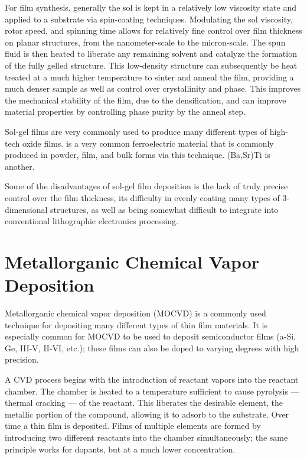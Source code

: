 For film synthesis, generally the sol is kept in a relatively low viscosity state and applied to a substrate via spin-coating techniques. Modulating the sol viscosity, rotor speed, and spinning time allows for relatively fine control over film thickness on planar structures, from the nanometer-scale to the micron-scale. The spun fluid is then heated to liberate any remaining solvent and catalyze the formation of the fully gelled structure. This low-density structure can subsequently be heat treated at a much higher temperature to sinter and anneal the film, providing a much denser sample as well as control over crystallinity and phase. This improves the mechanical stability of the film, due to the densification, and can improve material properties by controlling phase purity by the anneal step. \cite{brinker_sol-gel_1990,Fred_Al2O3_powders_1996,hanaor_solgel_tio2_2011,Yoldas_1979}

Sol-gel films are very commonly used to produce many different types of high-tech oxide films. \cite{Takashi_1994} is a very common ferroelectric material that is commonly produced in powder, film, and bulk forms via this technique. (Ba,Sr)Ti is another.\cite{Tahan_1996}

Some of the disadvantages of sol-gel film deposition is the lack of truly precise control over the film thickness, its difficulty in evenly coating many types of 3-dimensional structures, as well as being somewhat difficult to integrate into conventional lithographic electronics processing.\cite{brinker_sol-gel_1990,Fred_Al2O3_powders_1996,hanaor_solgel_tio2_2011,Yoldas_1979} 


\section{Metallorganic Chemical Vapor Deposition}
\label{sec:Synth-MOCVD}

Metallorganic chemical vapor deposition (MOCVD) is a commonly used technique for depositing many different types of thin film materials. It is especially common for MOCVD to be used to deposit semiconductor films (a-Si, Ge, III-V, II-VI, etc.); these films can also be doped to varying degrees with high precision.\cite{Malshe_1999,Matsumara_1998,Muralt_2000}

A CVD process begins with the introduction of reactant vapors into the reactant chamber. The chamber is heated to a temperature sufficient to cause pyrolysis --- thermal cracking --- of the reactant. This liberates the desirable element, the metallic portion of the compound, allowing it to adsorb to the substrate. Over time a thin film is deposited. Films of multiple elements are formed by introducing two different reactants into the chamber simultaneously; the same principle works for dopants, but at a much lower concentration.\cite{Malshe_1999,Matsumara_1998,Muralt_2000} 

